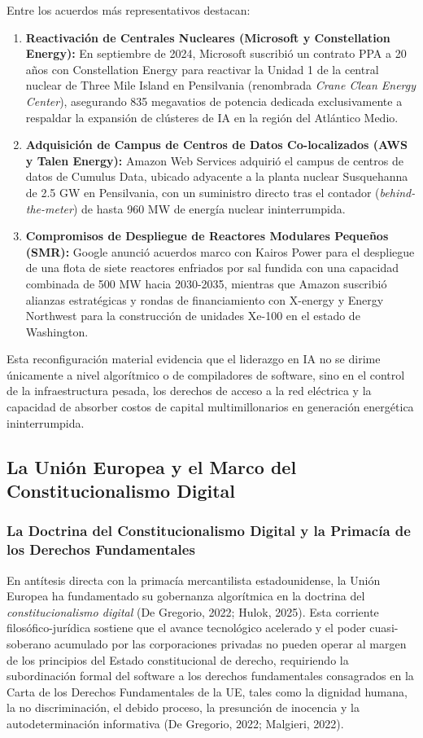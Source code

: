 Entre los acuerdos más representativos destacan:
\begin{enumerate}[label=\arabic*., leftmargin=2em]
    \item \textbf{Reactivación de Centrales Nucleares (Microsoft y Constellation Energy):} En septiembre de 2024, Microsoft suscribió un contrato PPA a 20 años con Constellation Energy para reactivar la Unidad 1 de la central nuclear de Three Mile Island en Pensilvania (renombrada \textit{Crane Clean Energy Center}), asegurando 835 megavatios de potencia dedicada exclusivamente a respaldar la expansión de clústeres de IA en la región del Atlántico Medio.
    \item \textbf{Adquisición de Campus de Centros de Datos Co-localizados (AWS y Talen Energy):} Amazon Web Services adquirió el campus de centros de datos de Cumulus Data, ubicado adyacente a la planta nuclear Susquehanna de 2.5 GW en Pensilvania, con un suministro directo tras el contador (\textit{behind-the-meter}) de hasta 960 MW de energía nuclear ininterrumpida.
    \item \textbf{Compromisos de Despliegue de Reactores Modulares Pequeños (SMR):} Google anunció acuerdos marco con Kairos Power para el despliegue de una flota de siete reactores enfriados por sal fundida con una capacidad combinada de 500 MW hacia 2030-2035, mientras que Amazon suscribió alianzas estratégicas y rondas de financiamiento con X-energy y Energy Northwest para la construcción de unidades Xe-100 en el estado de Washington.
\end{enumerate}

Esta reconfiguración material evidencia que el liderazgo en IA no se dirime únicamente a nivel algorítmico o de compiladores de software, sino en el control de la infraestructura pesada, los derechos de acceso a la red eléctrica y la capacidad de absorber costos de capital multimillonarios en generación energética ininterrumpida.


\subsection{La Unión Europea y el Marco del Constitucionalismo Digital}

\subsubsection{La Doctrina del Constitucionalismo Digital y la Primacía de los Derechos Fundamentales}

En antítesis directa con la primacía mercantilista estadounidense, la Unión Europea ha fundamentado su gobernanza algorítmica en la doctrina del \textit{constitucionalismo digital} (De Gregorio, 2022; Hulok, 2025). Esta corriente filosófico-jurídica sostiene que el avance tecnológico acelerado y el poder cuasi-soberano acumulado por las corporaciones privadas no pueden operar al margen de los principios del Estado constitucional de derecho, requiriendo la subordinación formal del software a los derechos fundamentales consagrados en la Carta de los Derechos Fundamentales de la UE, tales como la dignidad humana, la no discriminación, el debido proceso, la presunción de inocencia y la autodeterminación informativa (De Gregorio, 2022; Malgieri, 2022).

